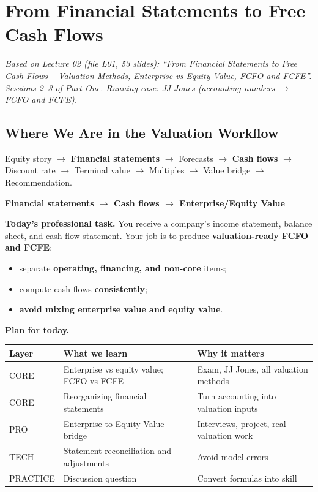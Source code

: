 \chapter{From Financial Statements to Free Cash Flows}\label{ch:fcf}

\emph{Based on Lecture 02 (file L01, 53 slides): ``From Financial Statements to Free Cash Flows -- Valuation Methods, Enterprise vs Equity Value, FCFO and FCFE''. Sessions 2--3 of Part One. Running case: JJ Jones (accounting numbers $\to$ FCFO and FCFE).}

\section{Where We Are in the Valuation Workflow}

Equity story $\to$ \textbf{Financial statements} $\to$ Forecasts $\to$ \textbf{Cash flows} $\to$ Discount rate $\to$ Terminal value $\to$ Multiples $\to$ Value bridge $\to$ Recommendation.

\begin{keybox}[Today]
\textbf{Financial statements $\longrightarrow$ Cash flows $\longrightarrow$ Enterprise/Equity Value}
\end{keybox}

\textbf{Today's professional task.} You receive a company's income statement, balance sheet, and cash-flow statement. Your job is to produce \textbf{valuation-ready FCFO and FCFE}:
\begin{itemize}
  \item separate \textbf{operating, financing, and non-core} items;
  \item compute cash flows \textbf{consistently};
  \item \textbf{avoid mixing enterprise value and equity value}.
\end{itemize}

\textbf{Plan for today.}
\begin{center}
\small
\begin{tabular}{@{}lll@{}}
\toprule
\textbf{Layer} & \textbf{What we learn} & \textbf{Why it matters}\\
\midrule
CORE & Enterprise vs equity value; FCFO vs FCFE & Exam, JJ Jones, all valuation methods\\
CORE & Reorganizing financial statements & Turn accounting into valuation inputs\\
PRO & Enterprise-to-Equity Value bridge & Interviews, project, real valuation work\\
TECH & Statement reconciliation and adjustments & Avoid model errors\\
PRACTICE & Discussion question & Convert formulas into skill\\
\bottomrule
\end{tabular}
\end{center}

